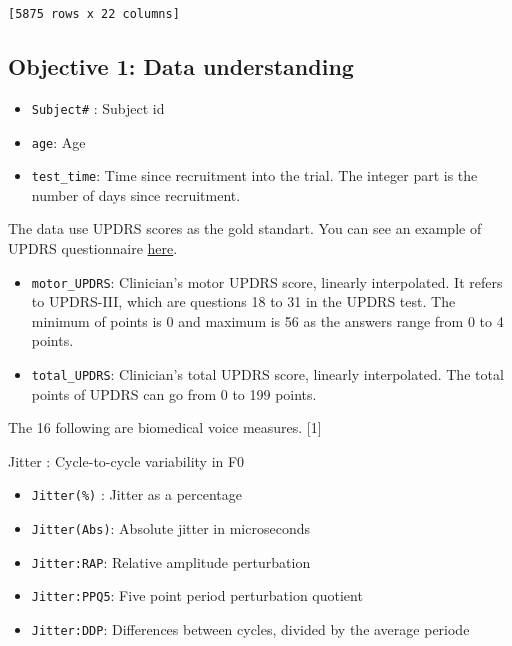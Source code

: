 \documentclass[11pt]{article}
\providecommand{\tightlist}{%
      \setlength{\itemsep}{0pt}\setlength{\parskip}{0pt}}
\begin{document}
\begin{Verbatim}[commandchars=\\\{\}]
        [5875 rows x 22 columns]
\end{Verbatim}
            
    \subsection{Objective 1: Data
understanding}\label{objective-1-data-understanding}

    

    \begin{itemize}
\tightlist
\item
  \texttt{Subject\#} : Subject id
\item
  \texttt{age}: Age
\item
  \texttt{test\_time}: Time since recruitment into the trial. The
  integer part is the number of days since recruitment.
\end{itemize}

The data use UPDRS scores as the gold standart. You can see an example
of UPDRS questionnaire
\href{https://img.medscape.com/fullsize/701/816/58977_UPDRS.pdf}{here}.

\begin{itemize}
\item
  \texttt{motor\_UPDRS}: Clinician's motor UPDRS score, linearly
  interpolated. It refers to UPDRS-III, which are questions 18 to 31 in
  the UPDRS test. The minimum of points is 0 and maximum is 56 as the
  answers range from 0 to 4 points.
\item
  \texttt{total\_UPDRS}: Clinician's total UPDRS score, linearly
  interpolated. The total points of UPDRS can go from 0 to 199 points.
\end{itemize}

The 16 following are biomedical voice measures. {[}1{]}

Jitter : Cycle-to-cycle variability in F0

\begin{itemize}
\tightlist
\item
  \texttt{Jitter(\%)} : Jitter as a percentage
\item
  \texttt{Jitter(Abs)}: Absolute jitter in microseconds
\item
  \texttt{Jitter:RAP}: Relative amplitude perturbation
\item
  \texttt{Jitter:PPQ5}: Five point period perturbation quotient
\item
  \texttt{Jitter:DDP}: Differences between cycles, divided by the
  average periode
\end{itemize}
\end{document}

